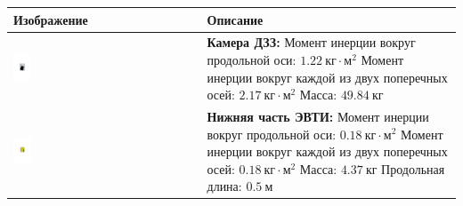 \begin{table}[ht!]
    \centering
    \begin{tabu} spread \textwidth {X[-1,c,m]|X[l,m]}                                                   \hline
        Изображение & Описание                                                                          \\ \hline
        \includegraphics[width=0.1\textwidth, keepaspectratio]
                        {./src/pictures/sattelite_3d_images/camera}
        &
        \textbf{Камера ДЗЗ:}                                                                            \newline
        Момент инерции вокруг продольной оси: $1.22 ~\textit{кг} \cdot \textit{м}^{2}$                  \newline
        Момент инерции вокруг каждой из двух поперечных  осей: $2.17 ~\textit{кг} \cdot \textit{м}^{2}$ \newline
        Масса: $49.84 ~\textit{кг}$                                                                     \\ \hline

        \includegraphics[width=0.1\textwidth, keepaspectratio]
                        {./src/pictures/sattelite_3d_images/bottom_shell_part}
        &
        \textbf{Нижняя часть ЭВТИ:}                                                                     \newline
        Момент инерции вокруг продольной оси: $0.18 ~\textit{кг} \cdot \textit{м}^{2}$                  \newline
        Момент инерции вокруг каждой из двух поперечных  осей: $0.18 ~\textit{кг} \cdot \textit{м}^{2}$ \newline
        Масса: $4.37 ~\textit{кг}$                                                                      \newline
        Продольная длина: $0.5 ~\textit{м}$                                                             \\ \hline


\end{tabu}
\end{table}
